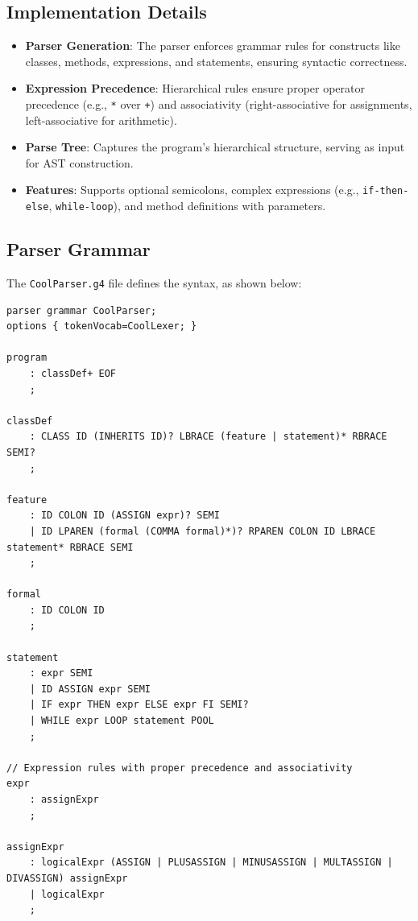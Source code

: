 \documentclass[12pt]{article}
\begin{document}
\subsection{Implementation Details}
\begin{itemize}[itemsep=2pt]
    \item \textbf{Parser Generation}: The parser enforces grammar rules for constructs like classes, methods, expressions, and statements, ensuring syntactic correctness.
    \item \textbf{Expression Precedence}: Hierarchical rules ensure proper operator precedence (e.g., \texttt{*} over \texttt{+}) and associativity (right-associative for assignments, left-associative for arithmetic).
    \item \textbf{Parse Tree}: Captures the program’s hierarchical structure, serving as input for AST construction.
    \item \textbf{Features}: Supports optional semicolons, complex expressions \newline (e.g., \texttt{if-then-else}, \texttt{while-loop}), and method definitions with parameters.
\end{itemize}

\subsection{Parser Grammar}
The \texttt{CoolParser.g4} file defines the syntax, as shown below:

\begin{lstlisting}[language=ANTLR,caption={Excerpt from CoolParser.g4}]
parser grammar CoolParser;
options { tokenVocab=CoolLexer; }

program
    : classDef+ EOF
    ;

classDef
    : CLASS ID (INHERITS ID)? LBRACE (feature | statement)* RBRACE SEMI?
    ;

feature
    : ID COLON ID (ASSIGN expr)? SEMI
    | ID LPAREN (formal (COMMA formal)*)? RPAREN COLON ID LBRACE statement* RBRACE SEMI
    ;

formal
    : ID COLON ID
    ;

statement
    : expr SEMI
    | ID ASSIGN expr SEMI
    | IF expr THEN expr ELSE expr FI SEMI?
    | WHILE expr LOOP statement POOL
    ;

// Expression rules with proper precedence and associativity
expr
    : assignExpr
    ;

assignExpr
    : logicalExpr (ASSIGN | PLUSASSIGN | MINUSASSIGN | MULTASSIGN | DIVASSIGN) assignExpr
    | logicalExpr
    ;
\end{lstlisting}
\end{document}
